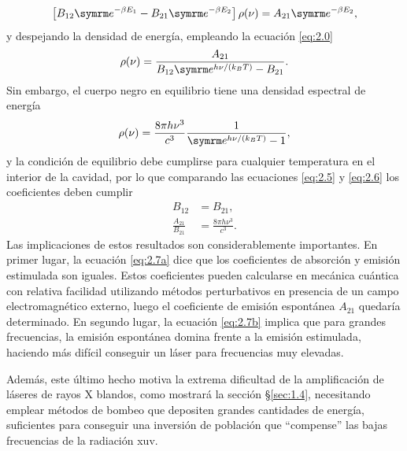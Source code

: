 \begin{equation}\label{eq:2.4}
  \left[B_{12}\eu^{-\beta E_{1}}-B_{21}\eu^{-\beta E_{2}}\right] \rho(\nu) = A_{21}\eu^{-\beta E_{2}},
\end{equation}
y despejando la densidad de energía, empleando la ecuación \eqref{eq:2.0}
\begin{equation}\label{eq:2.5}
  \rho(\nu) = \frac{A_{21}}{B_{12}\eu^{h \nu/(k_{B}T)} - B_{21}}.
\end{equation}
Sin embargo, el cuerpo negro en equilibrio tiene una densidad espectral de energía \autocite{Feynman2011}
\begin{equation}\label{eq:2.6}
  \rho(\nu) = \frac{8 \pi h \nu^{3}}{c^{3}}\frac{1}{\eu^{h \nu/(k_{B}T)} - 1},
\end{equation}
y la condición de equilibrio debe cumplirse para cualquier temperatura en el interior de la cavidad, por lo que comparando las ecuaciones \eqref{eq:2.5} y \eqref{eq:2.6} los coeficientes deben cumplir
\begin{align}
  \label{eq:2.7a}
  B_{12} &= B_{21}, \\
  \label{eq:2.7b}
  \frac{A_{21}}{B_{21}} &= \frac{8 \pi h \nu^{3}}{c^{3}}.
\end{align}
Las implicaciones de estos resultados son considerablemente importantes. En primer lugar, la ecuación \eqref{eq:2.7a} dice que los coeficientes de absorción y emisión estimulada son iguales. Estos coeficientes pueden calcularse en mecánica cuántica \autocite{Sakurai2020} con relativa facilidad utilizando métodos perturbativos en presencia de un campo electromagnético externo, luego el coeficiente de emisión espontánea $A_{21}$ quedaría determinado. En segundo lugar, la ecuación \eqref{eq:2.7b} implica que para grandes frecuencias, la emisión espontánea domina frente a la emisión estimulada, haciendo más difícil conseguir un láser para frecuencias muy elevadas. 

Además, este último hecho motiva la extrema dificultad de la amplificación de láseres de rayos X blandos, como mostrará la sección \S\ref{sec:1.4}, necesitando emplear métodos de bombeo que depositen grandes cantidades de energía, suficientes para conseguir una inversión de población que \enquote{compense} las bajas frecuencias de la radiación \acrshort{xuv}. 

